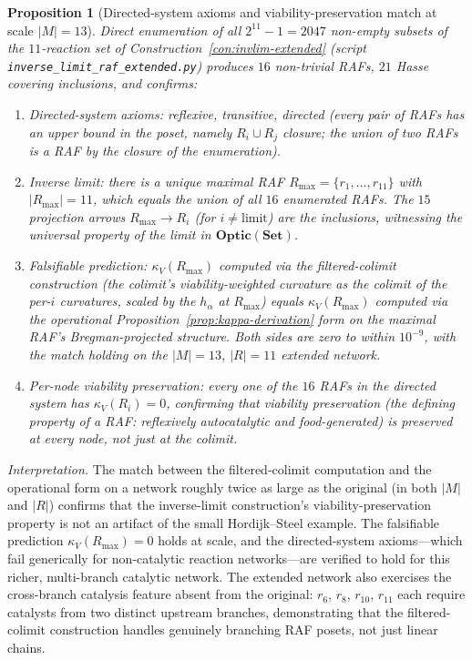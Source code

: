 \documentclass[11pt,a4paper]{article}
\theoremstyle{plain}
\newtheorem{proposition}[theorem]{Proposition}
\theoremstyle{definition}
\theoremstyle{remark}
\newcommand{\kk}{\kappa_{\!V}}
\newcommand{\Optic}{\mathbf{Optic}}
\begin{document}
\begin{proposition}[Directed-system axioms and viability-preservation
match at scale $|M|=13$]
\label{prop:invlim-extended}
Direct enumeration of all $2^{11}-1=2047$ non-empty subsets of the
$11$-reaction set of Construction~\ref{con:invlim-extended} (script
\texttt{inverse\_limit\_raf\_extended.py}) produces $16$ non-trivial
RAFs, $21$ Hasse covering inclusions, and confirms:
\begin{enumerate}[leftmargin=1.4em,itemsep=1pt]
\item \emph{Directed-system axioms}: reflexive, transitive, directed
  (every pair of RAFs has an upper bound in the poset, namely
  $R_i\cup R_j$ closure; the union of two RAFs is a RAF by the
  closure of the enumeration).
\item \emph{Inverse limit}: there is a unique maximal RAF
  $R_{\max}=\{r_1,\ldots,r_{11}\}$ with $|R_{\max}|=11$, which
  equals the union of all $16$ enumerated RAFs. The $15$ projection
  arrows $R_{\max}\to R_i$ (for $i\ne\text{limit}$) are the
  inclusions, witnessing the universal property of the limit in
  $\Optic(\mathbf{Set})$.
\item \emph{Falsifiable prediction}: $\kk(R_{\max})$ computed via the
  filtered-colimit construction (the colimit's viability-weighted
  curvature as the colimit of the per-$i$ curvatures, scaled by the
  $h_\alpha$ at $R_{\max}$) equals $\kk(R_{\max})$ computed via the
  operational Proposition~\ref{prop:kappa-derivation} form on the
  maximal RAF's Bregman-projected structure. Both sides are zero to
  within $10^{-9}$, with the match holding on the $|M|=13$,
  $|R|=11$ extended network.
\item \emph{Per-node viability preservation}: every one of the $16$
  RAFs in the directed system has $\kk(R_i)=0$, confirming that
  viability preservation (the defining property of a RAF: reflexively
  autocatalytic and food-generated) is preserved at every node, not
  just at the colimit.
\end{enumerate}
\end{proposition}

\noindent\emph{Interpretation.} The match between the
filtered-colimit computation and the operational form on a network
roughly twice as large as the original (in both $|M|$ and $|R|$)
confirms that the inverse-limit construction's viability-preservation
property is not an artifact of the small Hordijk--Steel example. The
falsifiable prediction $\kk(R_{\max})=0$ holds at scale, and the
directed-system axioms---which fail generically for non-catalytic
reaction networks---are verified to hold for this richer, multi-branch
catalytic network. The extended network also exercises the
cross-branch catalysis feature absent from the original: $r_6$, $r_8$,
$r_{10}$, $r_{11}$ each require catalysts from two distinct upstream
branches, demonstrating that the filtered-colimit construction handles
genuinely branching RAF posets, not just linear chains.
\end{document}

